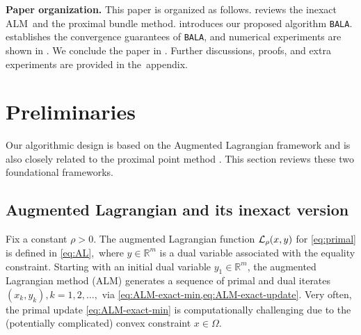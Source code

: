 \documentclass[11pt]{article}
\newcommand{\alg}{\texttt{BALA}}%
\begin{document}
\vspace{3pt}
\noindent \textbf{Paper organization.} 
This paper is organized as follows.  reviews the inexact ALM~and the proximal bundle method.  introduces our proposed algorithm \alg{}.  establishes the convergence guarantees of \alg{}, and numerical experiments are shown in . We conclude the paper in . Further discussions, proofs, and extra experiments are provided in the~appendix. 


\section{Preliminaries}
\label{section-preliminary}
Our algorithmic design is based on the Augmented Lagrangian framework \cite{rockafellar1976augmented} and is also closely related to the proximal point method \cite{rockafellar1976monotone}. 
This section reviews these two foundational frameworks. 

\subsection{Augmented Lagrangian and its inexact version}
Fix a constant $\rho > 0$. The augmented Lagrangian function $\mathcal{L}_\rho(x,y)$ for \cref{eq:primal} is defined in \cref{eq:AL},~where $y \in \mathbb{R}^m$ is a dual variable associated with the equality constraint. Starting with an initial dual variable $y_1 \in \mathbb{R}^m$, the augmented Lagrangian method (ALM) generates a sequence of primal and dual iterates $(x_k,y_k), k = 1, 2, \ldots, $ via \cref{eq:ALM-exact-min,eq:ALM-exact-update}. Very often, the primal update \cref{eq:ALM-exact-min} is computationally challenging due to the (potentially complicated) convex constraint $x \in \Omega$.   
\end{document}
